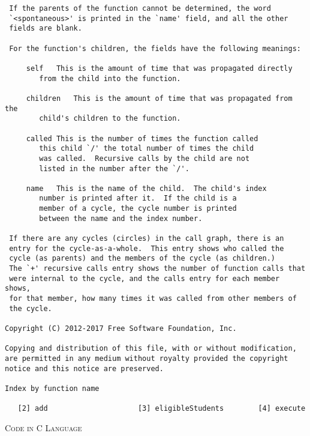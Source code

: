 \documentclass{report}
\begin{document}
\begin{verbatim}
 If the parents of the function cannot be determined, the word
 `<spontaneous>' is printed in the `name' field, and all the other
 fields are blank.

 For the function's children, the fields have the following meanings:

     self	This is the amount of time that was propagated directly
		from the child into the function.

     children	This is the amount of time that was propagated from the
		child's children to the function.

     called	This is the number of times the function called
		this child `/' the total number of times the child
		was called.  Recursive calls by the child are not
		listed in the number after the `/'.

     name	This is the name of the child.  The child's index
		number is printed after it.  If the child is a
		member of a cycle, the cycle number is printed
		between the name and the index number.

 If there are any cycles (circles) in the call graph, there is an
 entry for the cycle-as-a-whole.  This entry shows who called the
 cycle (as parents) and the members of the cycle (as children.)
 The `+' recursive calls entry shows the number of function calls that
 were internal to the cycle, and the calls entry for each member shows,
 for that member, how many times it was called from other members of
 the cycle.

Copyright (C) 2012-2017 Free Software Foundation, Inc.

Copying and distribution of this file, with or without modification,
are permitted in any medium without royalty provided the copyright
notice and this notice are preserved.

Index by function name

   [2] add                     [3] eligibleStudents        [4] execute

\end{verbatim}

\break

\hfill

\begin{center}
	\textsc{\LARGE{Code in C Language}}
\end{center}
\end{document}
